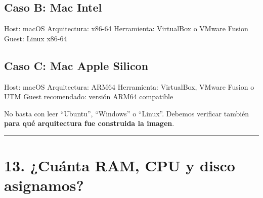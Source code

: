 \documentclass[
  spanish,
  letterpaper,
]{scrbook}
\newenvironment{Shaded}{\begin{snugshade}}{\end{snugshade}}
\newcommand{\NormalTok}[1]{\textcolor[rgb]{0.00,0.23,0.31}{#1}}
\begin{document}
\section{Caso B: Mac Intel}\label{caso-b-mac-intel}

\begin{Shaded}
\begin{Highlighting}[]
\NormalTok{Host: macOS}
\NormalTok{Arquitectura: x86{-}64}
\NormalTok{Herramienta: VirtualBox o VMware Fusion}
\NormalTok{Guest: Linux x86{-}64}
\end{Highlighting}
\end{Shaded}

\section{Caso C: Mac Apple Silicon}\label{caso-c-mac-apple-silicon}

\begin{Shaded}
\begin{Highlighting}[]
\NormalTok{Host: macOS}
\NormalTok{Arquitectura: ARM64}
\NormalTok{Herramienta: VirtualBox, VMware Fusion o UTM}
\NormalTok{Guest recomendado: versión ARM64 compatible}
\end{Highlighting}
\end{Shaded}

\begin{tcolorbox}[enhanced jigsaw, arc=.35mm, bottomrule=.15mm, bottomtitle=1mm, breakable, colback=white, colbacktitle=quarto-callout-warning-color!10!white, colframe=quarto-callout-warning-color-frame, coltitle=black, left=2mm, leftrule=.75mm, opacityback=0, opacitybacktitle=0.6, rightrule=.15mm, title=\textcolor{quarto-callout-warning-color}{\faExclamationTriangle}\hspace{0.5em}{Especialmente importante en Apple Silicon}, titlerule=0mm, toprule=.15mm, toptitle=1mm]

No basta con leer ``Ubuntu'', ``Windows'' o ``Linux''. Debemos verificar
también \textbf{para qué arquitectura fue construida la imagen}.

\end{tcolorbox}

\begin{center}\rule{0.5\linewidth}{0.5pt}\end{center}


\chapter{13. ¿Cuánta RAM, CPU y disco
asignamos?}\label{cuuxe1nta-ram-cpu-y-disco-asignamos}
\end{document}
